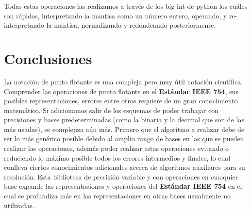 \documentclass[a4paper,10pt,twocolumn]{article}
\begin{document}
	
	Todas estas operaciones las realizamos a través de los big int de python los cu\'ales son rápidos, interpretando la mantisa como un número entero, operando, y re-interpretando la mantisa, normalizando y redondeando posteriormente.
	
	
	
	
	
	
	
	
	
	
	
	
	\section{Conclusiones}\label{sec:conc}
	
	La notación de punto flotante es una compleja pero muy útil notación científica. Comprender las operaciones de punto flotante en el \textbf{Estándar IEEE 754}, sus posibles representaciones, errores entre otros requiere de un gran conocimiento matemático. Si adicionamos salir de los esquemas de poder trabajar con precisiones y bases predeterminadas (como la binaria y la decimal que son de las más usadas), se complejiza aún más. Primero que el algoritmo a realizar debe de ser lo más genérico posible debido al amplio rango de bases en las que se pueden realizar las operaciones, además poder realizar estas operaciones evitando o reduciendo lo máximo posible todos los errores intermedios y finales, lo cual conlleva ciertos conocimientos adicionales acerca de algoritmos auxiliares para su resolución. Esta biblioteca de precisión variable y con operaciones en cualquier base expande las representaciones y operaciones del \textbf{Estándar IEEE 754} en el cual se profundiza más en las representaciones en otras bases usualmente no utilizadas.
	
	
\end{document}
